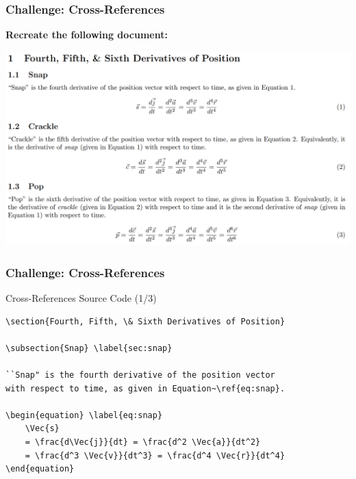 
\begin{frame}[fragile]
\frametitle{Challenge: Cross-References}
\begin{center}
    \textbf{Recreate the following document: }\\
\end{center}
\vspace{0.2cm}
\includegraphics[width=\linewidth]{img/cereal.png}
\end{frame}


\begin{frame}[fragile]
\frametitle{Challenge: Cross-References}
\begin{alertblock}{Cross-References Source Code (1/3)}
\small
\begin{verbatim}
\section{Fourth, Fifth, \& Sixth Derivatives of Position}

\subsection{Snap} \label{sec:snap}

``Snap" is the fourth derivative of the position vector 
with respect to time, as given in Equation~\ref{eq:snap}.

\begin{equation} \label{eq:snap}
    \Vec{s} 
    = \frac{d\Vec{j}}{dt} = \frac{d^2 \Vec{a}}{dt^2} 
    = \frac{d^3 \Vec{v}}{dt^3} = \frac{d^4 \Vec{r}}{dt^4}
\end{equation}
\end{verbatim}
\end{alertblock} 
\end{frame}


